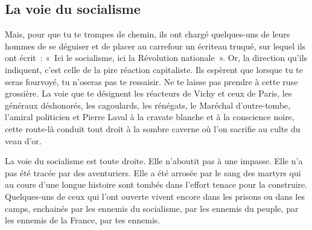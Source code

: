 \documentclass[french,twoside]{book} %
\begin{document}
\subsection[La voie du socialisme]{La voie du socialisme}
\noindent Mais, pour que tu te trompes de chemin, ils ont chargé quelques-uns de leurs hommes de se déguiser et de placer au carrefour un écriteau truqué, sur lequel ils ont écrit : « Ici le socialisme, ici la Révolution nationale ». Or, la direction qu’ils indiquent, c’est celle de la pire réaction capitaliste. Ils espèrent que lorsque tu te seras fourvoyé, tu n’oseras pas te ressaisir. Ne te laisse pas prendre à cette ruse grossière. La voie que te désignent les réacteurs de Vichy et ceux de Paris, les généraux déshonorés, les cagoulards, les rénégats, le Maréchal d’outre-tombe, l’amiral politicien et Pierre Laval à la cravate blanche et à la conscience noire, cette route-là conduit tout droit à la sombre caverne où l’on sacrifie au culte du veau d’or.\par
La voie du socialisme est toute droite. Elle n’aboutit pas à une impasse. Elle n’a pas été tracée par des aventuriers. Elle a été arrosée par le sang des martyrs qui au cours d’une longue histoire sont tombés dans l’effort tenace pour la construire. Quelques-uns de ceux qui l’ont ouverte vivent encore dans les prisons ou dans les camps, enchainés par les ennemis du socialisme, par les ennemis du peuple, par les ennemis de la France, par tes ennemis.
\end{document}
